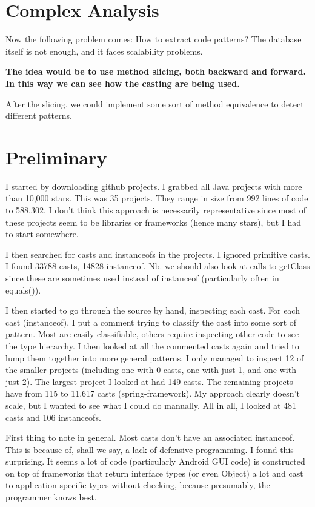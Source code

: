 \documentclass{usiinfdocprop}
\begin{document}
\section{Complex Analysis}
\label{sec:org799c82c}

Now the following problem comes: How to extract code patterns? 
The database itself is not enough, and it faces scalability problems. 

\textbf{\textbf{The idea would be to use method slicing, both backward and forward. 
In this way we can see how the casting are being used.}} 

After the slicing, we could implement some sort of method equivalence to detect 
different patterns. 
\section{Preliminary}
\label{sec:org641dec0}

I started by downloading github projects. 
I grabbed all Java projects with more than 10,000 stars. 
This was 35 projects. 
They range in size from 992 lines of code to 588,302. 
I don't think this approach is necessarily representative since most of these projects seem to be libraries or frameworks (hence many stars), but I had to start somewhere. 

I then searched for casts and instanceofs in the projects. 
I ignored primitive casts. 
I found 33788 casts, 14828 instanceof. 
Nb. we should also look at calls to getClass since these are sometimes used instead of instanceof (particularly often in equals()). 

I then started to go through the source by hand, inspecting each cast. 
For each cast (instanceof), I put a comment trying to classify the cast into some sort of pattern. 
Most are easily classifiable, others require inspecting other code to see the type hierarchy. 
I then looked at all the commented casts again and tried to lump them together into more general patterns. 
I only managed to inspect 12 of the smaller projects (including one with 0 casts, one with just 1, and one with just 2). 
The largest project I looked at had 149 casts. 
The remaining projects have from 115 to 11,617 casts (spring-framework). 
My approach clearly doesn't scale, but I wanted to see what I could do manually. 
All in all, I looked at 481 casts and 106 instanceofs. 

First thing to note in general. 
Most casts don't have an associated instanceof. 
This is because of, shall we say, a lack of defensive programming. 
I found this surprising. 
It seems a lot of code (particularly Android GUI code) is constructed on top of frameworks that return interface types (or even Object) a lot and cast to application-specific types without checking, because presumably, the programmer knows best. 
\end{document}
